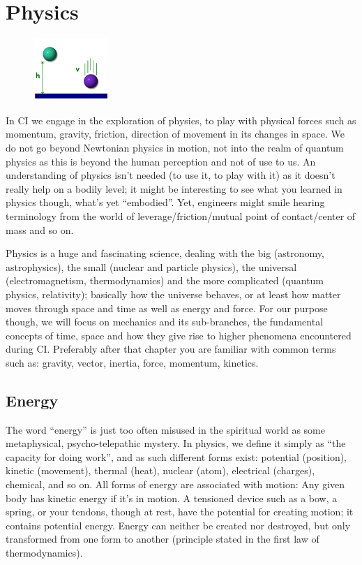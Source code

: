 \section{Physics}\label{sec:physics}

\begin{figure}
    \centering
    \includegraphics[width=0.25\textwidth]{images/physics}
\end{figure}

In CI we engage in the exploration of physics, to play with physical forces such as momentum, gravity, friction, direction of movement in its changes in space.
We do not go beyond Newtonian physics in motion, not into the realm of quantum physics as this is beyond the human perception and not of use to us.
An understanding of physics isn't needed (to use it, to play with it) as it doesn't really help on a bodily level; it might be interesting to see what you learned in physics though, what's yet ``embodied''.
Yet, engineers might smile hearing terminology from the world of leverage/friction/mutual point of contact/center of mass and so on.

Physics is a huge and fascinating science, dealing with the big (astronomy, astrophysics), the small (nuclear and particle physics), the universal (electromagnetism, thermodynamics) and the more complicated (quantum physics, relativity); basically how the universe behaves, or at least how matter moves through space and time as well as energy and force.
For our purpose though, we will focus on mechanics and its sub-branches, the fundamental concepts of time, space and how they give rise to higher phenomena encountered during CI\@.
Preferably after that chapter you are familiar with common terms such as: gravity, vector, inertia, force, momentum, kinetics.

\subsection{Energy}\label{subsec:energy}

The word ``energy'' is just too often misused in the spiritual world as some metaphysical, psycho-telepathic mystery.
In physics, we define it simply as ``the capacity for doing work'', and as such different forms exist: potential (position), kinetic (movement), thermal (heat), nuclear (atom), electrical (charges), chemical, and so on.
All forms of energy are associated with motion: Any given body has kinetic energy if it's in motion.
A tensioned device such as a bow, a spring, or your tendons, though at rest, have the potential for creating motion; it contains potential energy.
Energy can neither be created nor destroyed, but only transformed from one form to another (principle stated in the first law of thermodynamics).

